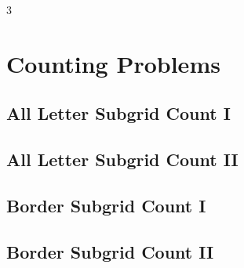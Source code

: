 \documentclass[8pt]{extarticle}
\begin{document}
\begin{multicols*}{3}

\section{Counting Problems}

\subsection{All Letter Subgrid Count I}
\begin{caixaenunciado}

\end{caixaenunciado}
\vspace{0.3cm}


\subsection{All Letter Subgrid Count II}
\begin{caixaenunciado}

\end{caixaenunciado}
\vspace{0.3cm}


\subsection{Border Subgrid Count I}
\begin{caixaenunciado}

\end{caixaenunciado}
\vspace{0.3cm}


\subsection{Border Subgrid Count II}
\begin{caixaenunciado}

\end{caixaenunciado}
\vspace{0.3cm}



\end{multicols*}
\end{document}
